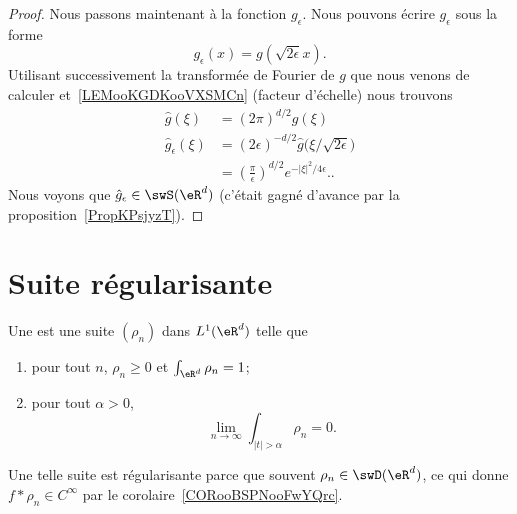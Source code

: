 \begin{proof}
    Nous passons maintenant à la fonction \( g_{\epsilon}\). Nous pouvons écrire \( g_{\epsilon}\) sous la forme
    \begin{equation}
        g_{\epsilon}(x)=g(\sqrt{ 2\epsilon }x).
    \end{equation}
        Utilisant successivement la transformée de Fourier de \( g\) que nous venons de calculer et~\ref{LEMooKGDKooVXSMCn} (facteur d'échelle) nous trouvons
        \begin{subequations}
            \begin{align}
                \hat g(\xi)&=(2\pi)^{d/2}g(\xi)\\
                \hat g_{\epsilon}(\xi)&=(2\epsilon)^{-d/2}\hat g\big( \xi/\sqrt{ 2\epsilon } \big)\\
                &=\left( \frac{ \pi }{ \epsilon } \right)^{d/2} e^{-| \xi |^2/4\epsilon} \label{SUBEQooFWIKooGMpFbo}..
            \end{align}
        \end{subequations}
        Nous voyons que \( \hat g_{\epsilon}\in\swS(\eR^d)\)  (c'était gagné d'avance par la proposition~\ref{PropKPsjyzT}).
\end{proof}

\section{Suite régularisante}

\begin{definition}      \label{DEFooRIFYooUUUoha}
    Une  est une suite \( (\rho_n)\) dans \( L^1(\eR^d)\) telle que
    \begin{enumerate}
        \item       \label{ITEMooEYXYooAkKeXX}
            pour tout \( n\), \( \rho_n\geq 0\) et \( \int_{\eR^d}\rho_n=1\);
        \item
            pour tout \( \alpha>0\),
            \begin{equation}
                \lim_{n\to \infty} \int_{| t |>\alpha}\rho_n=0.
            \end{equation}
    \end{enumerate}
\end{definition}
Une telle suite est régularisante parce que souvent \( \rho_n\in\swD(\eR^d)\), ce qui donne \( f*\rho_n\in C^{\infty}\) par le corolaire~\ref{CORooBSPNooFwYQrc}.

